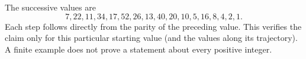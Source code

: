 The successive values are
\[7,22,11,34,17,52,26,13,40,20,10,5,16,8,4,2,1.\]
Each step follows directly from the parity of the preceding value. This verifies the claim only for this particular starting value (and the values along its trajectory). A finite example does not prove a statement about every positive integer.

